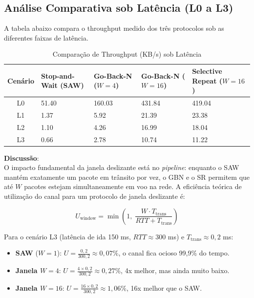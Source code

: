 \documentclass[12pt,a4paper]{article}
\begin{document}
\subsection{Análise Comparativa sob Latência (L0 a L3)}
A tabela abaixo compara o throughput medido dos três protocolos sob as diferentes faixas de latência.

\begin{table}[H]
    \centering
    \caption{Comparação de Throughput (KB/s) sob Latência}
    \begin{tabularx}{\textwidth}{c*{4}{Y}}
        \toprule
        \textbf{Cenário} & \textbf{Stop-and-Wait (SAW)} & \textbf{Go-Back-N ($W=4$)} & \textbf{Go-Back-N ($W=16$)} & \textbf{Selective Repeat ($W=16$)} \\
        \midrule
        L0 & 51.40  & 160.03  & 431.84  & 419.04 \\
        L1 & 1.37   & 5.92    & 21.39   & 23.38  \\
        L2 & 1.10   & 4.26    & 16.99   & 18.04  \\
        L3 & 0.66   & 2.78    & 10.74   & 11.22  \\
        \bottomrule
    \end{tabularx}
    \label{tab:comparativo_latencia}
\end{table}

\noindent \textbf{Discussão}:
\\
O impacto fundamental da janela deslizante está no \textit{pipeline}: enquanto o SAW mantém exatamente um pacote em trânsito por vez, o GBN e o SR permitem que até $W$ pacotes estejam simultaneamente em voo na rede. A eficiência teórica de utilização do canal para um protocolo de janela deslizante é:

\begin{equation}
    U_{\text{window}} = \min\!\left(1,\; \frac{W \cdot T_{\text{trans}}}{RTT + T_{\text{trans}}}\right)
\end{equation}

Para o cenário L3 (latência de ida 150 ms, $RTT \approx 300$ ms) e $T_{\text{trans}} \approx 0{,}2$ ms:
\begin{itemize}
    \item \textbf{SAW} ($W = 1$): $U = \frac{0{,}2}{300{,}2} \approx 0{,}07\%$, o canal fica ocioso 99,9\% do tempo.
    \item \textbf{Janela $W = 4$}: $U = \frac{4 \times 0{,}2}{300{,}2} \approx 0{,}27\%$, 4x melhor, mas ainda muito baixo.
    \item \textbf{Janela $W = 16$}: $U = \frac{16 \times 0{,}2}{300{,}2} \approx 1{,}06\%$, 16x melhor que o SAW.
\end{itemize}
\end{document}
